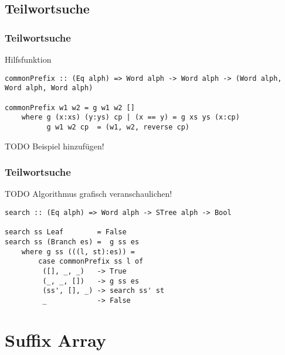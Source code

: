 \documentclass{beamer}
\begin{document}
\subsection{Teilwortsuche}

\begin{frame}[fragile]
\frametitle{Teilwortsuche}
Hilfsfunktion
\begin{lstlisting}
commonPrefix :: (Eq alph) => Word alph -> Word alph -> (Word alph, Word alph, Word alph)

commonPrefix w1 w2 = g w1 w2 []
    where g (x:xs) (y:ys) cp | (x == y) = g xs ys (x:cp)
          g w1 w2 cp  = (w1, w2, reverse cp)
\end{lstlisting}
TODO Beispiel hinzufügen!
\end{frame}

\begin{frame}[fragile]
\frametitle{Teilwortsuche}
TODO Algorithmus grafisch veranschaulichen!
\begin{lstlisting}
search :: (Eq alph) => Word alph -> STree alph -> Bool

search ss Leaf        = False
search ss (Branch es) =  g ss es
    where g ss (((l, st):es)) =
        case commonPrefix ss l of
         ([], _, _)   -> True
         (_, _, [])   -> g ss es
         (ss', [], _) -> search ss' st
         _            -> False
\end{lstlisting}
\end{frame}

\section{Suffix Array}
\end{document}
